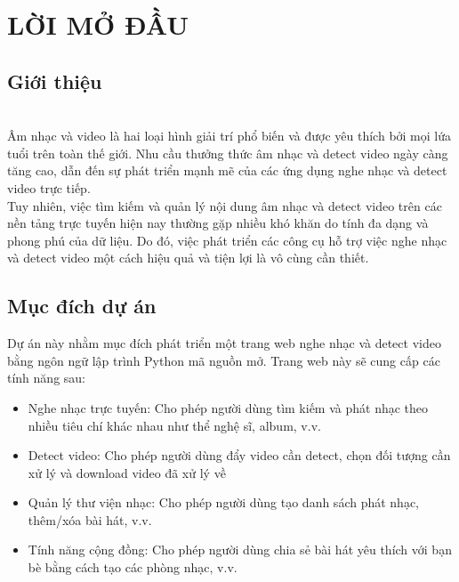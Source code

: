\documentclass[a4paper]{article}
\begin{document}
\thispagestyle{empty}

\newpage
\tableofcontents
\newpage



\section{LỜI MỞ ĐẦU}
\subsection{Giới thiệu}
		\begin{mdframed}[hidealllines=true]
  \\
    \indent Âm nhạc và video là hai loại hình giải trí phổ biến và được yêu thích bởi mọi lứa tuổi trên toàn thế giới. Nhu cầu thưởng thức âm nhạc và detect video ngày càng tăng cao, dẫn đến sự phát triển mạnh mẽ của các ứng dụng nghe nhạc và detect video trực tiếp.
\\
    \indent Tuy nhiên, việc tìm kiếm và quản lý nội dung âm nhạc và detect video trên các nền tảng trực tuyến hiện nay thường gặp nhiều khó khăn do tính đa dạng và phong phú của dữ liệu. Do đó, việc phát triển các công cụ hỗ trợ việc nghe nhạc và detect video một cách hiệu quả và tiện lợi là vô cùng cần thiết.
  
	\end{mdframed}
	\subsection{Mục đích dự án}
	\indent Dự án này nhằm mục đích phát triển một trang web nghe nhạc và detect video bằng ngôn ngữ lập trình Python mã nguồn mở. Trang web này sẽ cung cấp các tính năng sau:
\begin{itemize}
	\item Nghe nhạc trực tuyến: Cho phép người dùng tìm kiếm và phát nhạc theo nhiều tiêu chí khác nhau như thể nghệ sĩ, album, v.v.
    \item Detect video: Cho phép người dùng đẩy video cần detect, chọn đối tượng cần xử lý và download video đã xử lý về 
    \item Quản lý thư viện nhạc: Cho phép người dùng tạo danh sách phát nhạc, thêm/xóa bài hát, v.v.
    \item Tính năng cộng đồng: Cho phép người dùng chia sẻ bài hát yêu thích với bạn bè bằng cách tạo các phòng nhạc, v.v.
\end{itemize}
\end{document}
